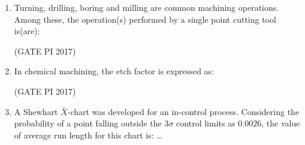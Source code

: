 \documentclass[journal,12pt,onecolumn]{IEEEtran}
\theoremstyle{remark}
\begin{document}
\begin{enumerate}
(P) support and transfer the stresses to the fibers  

(Q) reduce propagation of cracks  

(R) carry the entire load  

(S) protect the fibers against damage  

The correct statements are:
\begin{enumerate}
\end{enumerate}
\hfill (GATE PI 2017)

\item Turning, drilling, boring and milling are common machining operations. Among these, the operation(s) performed by a single point cutting tool is(are):
\begin{enumerate}
\end{enumerate}
\hfill (GATE PI 2017)

\newpage
\item In chemical machining, the etch factor is expressed as:
\begin{enumerate}
\end{enumerate}
\hfill (GATE PI 2017)
\newline
\item A Shewhart $\bar{X}$-chart was developed for an in-control process. Considering the probability of a point falling outside the $3\sigma$ control limits as $0.0026$, the value of average run length for this chart is:  
\dots   


\end{enumerate}
\end{document}
